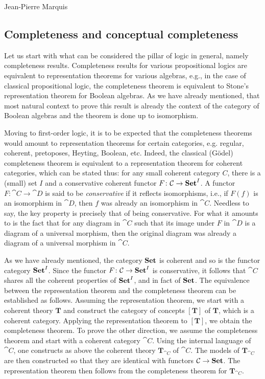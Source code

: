 \begin{artengenv}{Jean-Pierre Marquis}
\subsection{Completeness and conceptual completeness}

Let us start with what can be considered the pillar of logic in general, namely completeness results. Completeness results for various propositional logics are equivalent to representation theorems for various algebras, e.g., in the case of classical propositional logic, the completeness theorem is equivalent to Stone's representation theorem for Boolean algebras. As we have already mentioned, that most natural context to prove this result is already the context of the category of Boolean algebras and the theorem is done up to isomorphism. 

Moving to first-order logic, it is to be expected that the completeness theorems would amount to representation theorems for certain categories, e.g. regular, coherent, pretoposes, Heyting, Boolean, etc. Indeed, the classical (Gödel) completeness theorem is equivalent to a representation theorem for coherent categories, which can be stated thus: for any small coherent category \( C \), there is a (small) set \( I \) and a conservative coherent functor \( F\colon \mathcal{C} \rightarrow \mathbf{Set}^{I} \). A functor \( F\colon \cat{C} \rightarrow \cat{D} \) is said to be \textit{conservative} if it reflects isomorphisms, i.e., if \( F(f) \) is an isomorphism in \( \cat{D} \), then \( f \) was already an isomorphism in \( \cat{C} \). Needless to say, the key property is precisely that of being conservative. For what it amounts to is the fact that for any diagram in \( \cat{C} \) such that its image under \( F \) in \( \cat{D} \) is a diagram of a universal morphism, then the original diagram was already a diagram of a universal morphism in \( \cat{C} \). 

As we have already mentioned, the category \( \mathbf{Set} \) is coherent and so is the functor category \( \mathbf{Set}^{I} \). Since the functor \( F\colon \mathcal{C} \rightarrow \mathbf{Set}^{I} \) is conservative, it follows that \( \cat{C} \) shares all the coherent properties of \( \mathbf{Set}^{I} \), and in fact of \( \mathbf{Set} \). The equivalence between the representation theorem and the completeness theorem can be established as follows. Assuming the representation theorem, we start with a coherent theory \( \mathbf{T} \) and construct the category of concepts \( [\mathbf{T}] \) of \( \mathbf{T} \), which is a coherent category. Applying the representation theorem to \( [\mathbf{T}] \), we obtain the completeness theorem. To prove the other direction, we assume the completeness theorem and start with a coherent category \( \cat{C} \). Using the internal language of \( \cat{C} \), one constructs as above the coherent theory \( \mathbf{T}_{\cat{C}} \) of \( \cat{C} \). The models of \( \mathbf{T}_{\cat{C}} \) are then constructed so that they are identical with functors \( \mathcal{C} \rightarrow \mathbf{Set} \). The representation theorem then follows from the completeness theorem for \( \mathbf{T}_{\cat{C}} \).


\end{artengenv}
